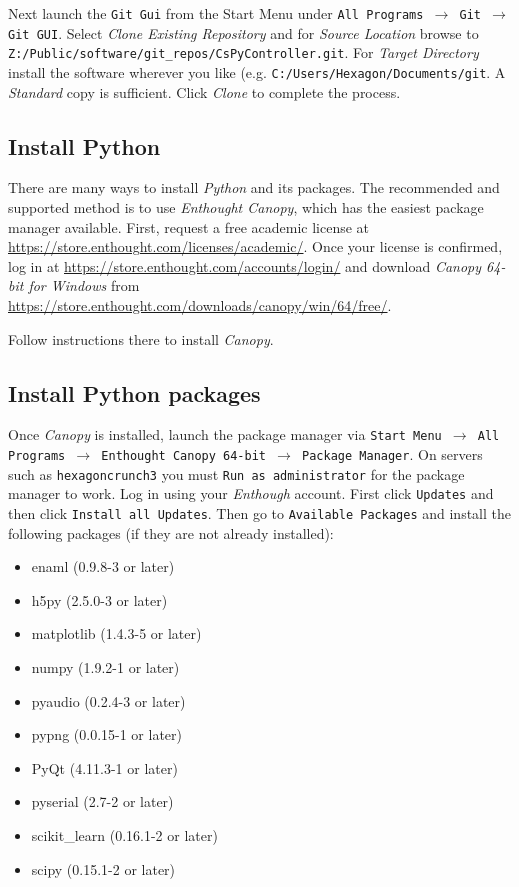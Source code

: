 \documentclass[pdftex,11pt,letterpaper]{article}
\begin{document}
Next launch the \texttt{Git Gui} from the Start Menu under \texttt{All Programs $\rightarrow$ Git $\rightarrow$ Git GUI}.  Select \textit{Clone Existing Repository} and for \textit{Source Location} browse to \texttt{Z:/Public/software/git\_repos/CsPyController.git}.  For \textit{Target Directory} install the software wherever you like (e.g. \texttt{C:/Users/Hexagon/Documents/git}.  A \textit{Standard} copy is sufficient.  Click \textit{Clone} to complete the process.

\subsection{Install Python}

There are many ways to install \textit{Python} and its packages.  The recommended and supported method is to use \textit{Enthought Canopy}, which has the easiest package manager available.  First, request a free academic license at \url{https://store.enthought.com/licenses/academic/}.  Once your license is confirmed, log in at \url{https://store.enthought.com/accounts/login/} and download \textit{Canopy 64-bit for Windows} from \url{https://store.enthought.com/downloads/canopy/win/64/free/}.

Follow instructions there to install \textit{Canopy}.

\subsection{Install Python packages}

Once \textit{Canopy} is installed, launch the package manager via \texttt{Start Menu $\rightarrow$ All Programs $\rightarrow$ Enthought Canopy 64-bit $\rightarrow$ Package Manager}.  On servers such as \texttt{hexagoncrunch3} you must \texttt{Run as administrator} for the package manager to work.  Log in using your \textit{Enthough} account.  First click \texttt{Updates} and then click \texttt{Install all Updates}.  Then go to \texttt{Available Packages} and install the following packages (if they are not already installed):

\begin{itemize}
\item enaml (0.9.8-3 or later)
\item h5py (2.5.0-3 or later)
\item matplotlib (1.4.3-5 or later)
\item numpy (1.9.2-1 or later)
\item pyaudio (0.2.4-3 or later)
\item pypng (0.0.15-1 or later)
\item PyQt (4.11.3-1 or later)
\item pyserial (2.7-2 or later)
\item scikit\_learn (0.16.1-2 or later)
\item scipy (0.15.1-2 or later)
\end{itemize}
\end{document}
